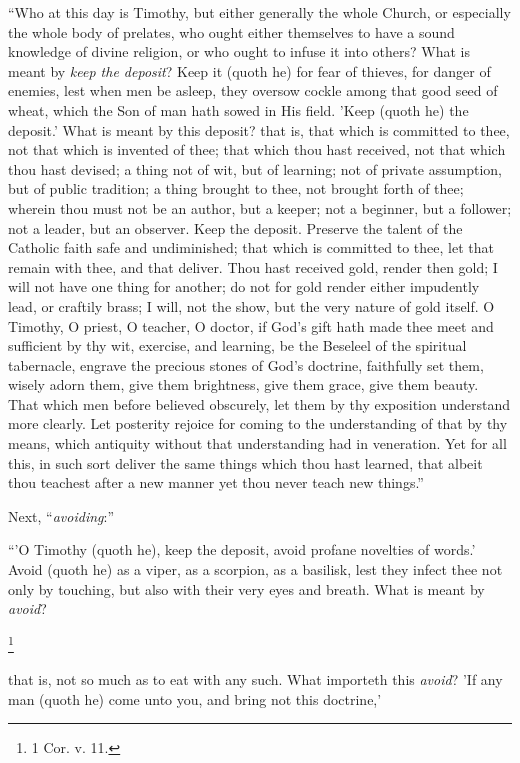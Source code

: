 ``Who at this day is Timothy, but either generally the whole
Church, or especially the whole body of prelates, who ought either
themselves to have a sound knowledge of divine religion, or who ought
to infuse it into others? What is meant by \emph{keep the deposit}?
Keep it (quoth he) for fear of thieves, for danger of enemies, lest
when men be asleep, they oversow cockle among that good seed of wheat,
which the Son of man hath sowed in His field. 'Keep (quoth he) the
deposit.' What is meant by this deposit? that is, that which is
committed to thee, not that which is invented of thee; that which thou
hast received, not that which thou hast devised; a thing not of wit,
but of learning; not of private assumption, but of public tradition; a
thing brought to thee, not brought forth of thee; wherein thou must
not be an author, but a keeper; not a beginner, but a follower; not a
leader, but an observer. Keep the deposit. Preserve the talent of the
Catholic faith safe and undiminished; that which is committed to thee,
let that remain with thee, and that deliver. Thou hast received gold,
render then gold; I will not have one thing for another; do not for
gold render either impudently lead, or craftily brass; I will, not the
show, but the very nature of gold itself. O Timothy, O priest, O
teacher, O doctor, if God's gift hath made thee meet and sufficient
by thy wit, exercise, and learning, be the Beseleel of the spiritual
tabernacle, engrave the precious stones of
God's doctrine, faithfully set them, wisely adorn them, give them
brightness, give them grace, give them beauty. That which men before
believed obscurely, let them by thy exposition understand more
clearly. Let posterity rejoice for coming to the understanding of that
by thy means, which antiquity without that understanding had in
veneration. Yet for all this, in such sort deliver the same things
which thou hast learned, that albeit thou teachest after a new manner
yet thou never teach new things.''

Next, ``\emph{avoiding}:''

``'O Timothy (quoth he), keep the deposit, avoid profane
novelties of words.' Avoid (quoth he) as a viper, as a scorpion, as a
basilisk, lest they infect thee not only by touching, but also with
their very eyes and breath. What is meant by \emph{avoid}?

\footnote{1 Cor. v. 11.}

that is, not so much as to eat with any such. What importeth this \emph{avoid}?
'If any man (quoth he) come unto you, and bring not this doctrine,'

